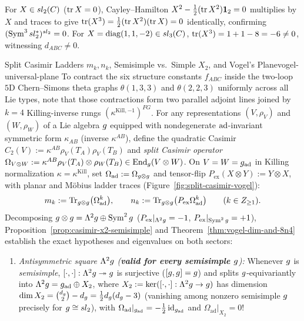\begin{example}
\label{ex:sl2-sl3-cubic}
For $X \in sl_2(C)$ ($\operatorname{tr} X = 0$), Cayley--Hamilton $X^2 - \frac{1}{2}(\operatorname{tr} X^2)\mathbf{1}_2 = 0$ multiplies by $X$ and traces to give $\operatorname{tr}(X^3) = \frac{1}{2}(\operatorname{tr} X^2)(\operatorname{tr} X) = 0$ identically, confirming $(\operatorname{Sym}^3sl_2^*)^{sl_2} = 0$. For $X = \operatorname{diag}(1,1,-2) \in sl_3(C)$, $\operatorname{tr}(X^3) = 1 + 1 - 8 = -6 \neq 0$, witnessing $d_{ABC} \neq 0$.
\end{example}

\label{subsec:vogel-plane}
\begin{zkmodule}{Split Casimir Ladders $m_k, n_k$, Semisimple vs.\ Simple $X_2$, and Vogel's Plane}{vogel-universal-plane}
To contract the six structure constants $f_{ABC}$ inside the two-loop $5\mathrm{D}$ Chern--Simons theta graphs $\theta(1,3,3)$ and $\theta(2,2,3)$ uniformly across all Lie types, note that those contractions form two parallel adjoint lines joined by $k = 4$ Killing-inverse rungs $(\kappa^{\mathrm{Kill},-1})^{FG}$. For any representations $(V,\rho_V)$ and $(W,\rho_W)$ of a Lie algebra $g$ equipped with nondegenerate $\operatorname{ad}$-invariant symmetric form $\kappa_{AB}$ (inverse $\kappa^{AB}$), define the quadratic Casimir $C_2(V) := \kappa^{AB}\rho_V(T_A)\rho_V(T_B)$ and \emph{split Casimir operator} $\Omega_{V\otimes W} := \kappa^{AB}\rho_V(T_A)\otimes\rho_W(T_B) \in \operatorname{End}_{g}(V\otimes W)$. On $V = W = g_{\mathrm{ad}}$ in Killing normalization $\kappa = \kappa^{\mathrm{Kill}}$, set $\Omega_{\mathrm{ad}} := \Omega_{g\otimes g}$ and tensor-flip $P_{\mathrm{ex}}(X\otimes Y) := Y\otimes X$, with planar and M\"obius ladder traces (Figure~\ref{fig:split-casimir-vogel}):
\begin{equation}
\label{eq:mk-nk-traces}
m_k := \operatorname{Tr}_{g\otimes g}\bigl(\Omega_{\mathrm{ad}}^k\bigr),\qquad
n_k := \operatorname{Tr}_{g\otimes g}\bigl(P_{\mathrm{ex}}\Omega_{\mathrm{ad}}^k\bigr)\qquad (k \in Z_{\ge 1}).
\end{equation}
Decomposing $g\otimes g = \Lambda^2g \oplus \operatorname{Sym}^2g$ ($P_{\mathrm{ex}}|_{\Lambda^2g} = -1$, $P_{\mathrm{ex}}|_{\operatorname{Sym}^2g} = +1$), Proposition~\ref{prop:casimir-x2-semisimple} and Theorem~\ref{thm:vogel-dim-and-8n4} establish the exact hypotheses and eigenvalues on both sectors:
\begin{enumerate}[leftmargin=*]
  \item \emph{Antisymmetric square $\Lambda^2g$ (\textbf{valid for every semisimple $g$}):} Whenever $g$ is \emph{semisimple}, $[\cdot,\cdot] : \Lambda^2g \twoheadrightarrow g$ is surjective ($[g,g] = g$) and splits $g$-equivariantly into $\Lambda^2g = g_{\mathrm{ad}} \oplus X_2$, where $X_2 := \ker([\cdot,\cdot] : \Lambda^2g \to g)$ has dimension $\dim X_2 = \binom{d_{g}}{2} - d_{g} = \frac{1}{2}d_{g}(d_{g} - 3)$ (vanishing among nonzero semisimple $g$ precisely for $g \cong sl_2$), with $\Omega_{\mathrm{ad}}|_{g_{\mathrm{ad}}} = -\frac{1}{2}\operatorname{id}_{g_{\mathrm{ad}}}$ and $\Omega_{\mathrm{ad}}|_{X_2} = 0$!

\end{enumerate}
\end{zkmodule}
